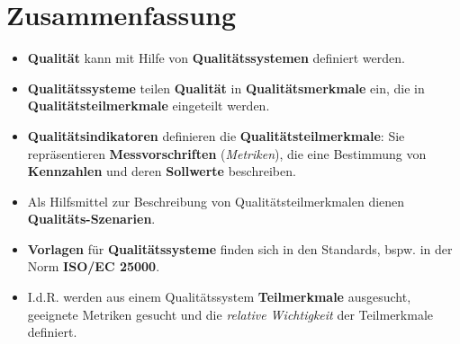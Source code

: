 \section{Zusammenfassung}

\begin{itemize}
    \item \textbf{Qualität} kann mit Hilfe von \textbf{Qualitätssystemen} definiert werden.
    \item \textbf{Qualitätssysteme} teilen \textbf{Qualität} in \textbf{Qualitätsmerkmale} ein, die in \textbf{Qualitätsteilmerkmale} eingeteilt werden.
    \item \textbf{Qualitätsindikatoren} definieren die \textbf{Qualitätsteilmerkmale}: Sie repräsentieren \textbf{Messvorschriften} (\textit{Metriken}), die eine Bestimmung von \textbf{Kennzahlen} und deren \textbf{Sollwerte} beschreiben.
    \item Als Hilfsmittel zur Beschreibung von Qualitätsteilmerkmalen dienen \textbf{Qualitäts-Szenarien}.
    \item \textbf{Vorlagen} für \textbf{Qualitätssysteme} finden sich in den Standards, bspw. in der Norm \textbf{ISO/EC 25000}.
    \item I.d.R. werden aus einem Qualitätssystem \textbf{Teilmerkmale} ausgesucht, geeignete Metriken gesucht und die \textit{relative Wichtigkeit} der Teilmerkmale definiert.
\end{itemize}